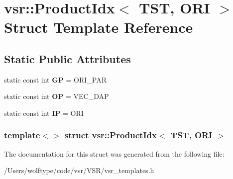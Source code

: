 \hypertarget{structvsr_1_1_product_idx_3_01_t_s_t_00_01_o_r_i_01_4}{\section{vsr\-:\-:Product\-Idx$<$ T\-S\-T, O\-R\-I $>$ Struct Template Reference}
\label{structvsr_1_1_product_idx_3_01_t_s_t_00_01_o_r_i_01_4}
}
\subsection*{Static Public Attributes}
\begin{DoxyCompactItemize}
\item 
\hypertarget{structvsr_1_1_product_idx_3_01_t_s_t_00_01_o_r_i_01_4_a2dcc62816911969017fe3aa01b5cd45f}{static const int {\bfseries G\-P} = O\-R\-I\-\_\-\-P\-A\-R}\label{structvsr_1_1_product_idx_3_01_t_s_t_00_01_o_r_i_01_4_a2dcc62816911969017fe3aa01b5cd45f}

\item 
\hypertarget{structvsr_1_1_product_idx_3_01_t_s_t_00_01_o_r_i_01_4_a60521ad58a2c35362778c32dcf44c713}{static const int {\bfseries O\-P} = V\-E\-C\-\_\-\-D\-A\-P}\label{structvsr_1_1_product_idx_3_01_t_s_t_00_01_o_r_i_01_4_a60521ad58a2c35362778c32dcf44c713}

\item 
\hypertarget{structvsr_1_1_product_idx_3_01_t_s_t_00_01_o_r_i_01_4_a69f4a0d5ae01e9510700c7b6f9d4f7b0}{static const int {\bfseries I\-P} = O\-R\-I}\label{structvsr_1_1_product_idx_3_01_t_s_t_00_01_o_r_i_01_4_a69f4a0d5ae01e9510700c7b6f9d4f7b0}

\end{DoxyCompactItemize}
\subsubsection*{template$<$$>$ struct vsr\-::\-Product\-Idx$<$ T\-S\-T, O\-R\-I $>$}



The documentation for this struct was generated from the following file\-:\begin{DoxyCompactItemize}
\item 
/\-Users/wolftype/code/vsr/\-V\-S\-R/vsr\-\_\-templates.\-h\end{DoxyCompactItemize}

